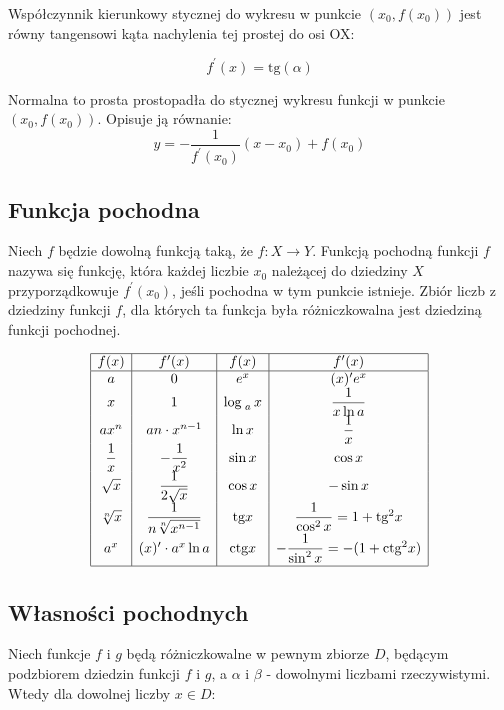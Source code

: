 \documentclass[14pt,a4paper]{extarticle}
\begin{document}
\noindent Współczynnik kierunkowy stycznej do wykresu w punkcie $(x_{0}, f(x_{0}))$ jest równy tangensowi kąta nachylenia tej prostej do osi OX:

$$f^{\prime}(x) = \text{tg}(\alpha)$$

\noindent Normalna to prosta prostopadła do stycznej wykresu funkcji w punkcie $(x_{0}, f(x_{0}))$. Opisuje ją
równanie:
$$y = -\frac{1}{f^{\prime}(x_{0})}(x - x_{0}) + f(x_{0})$$

\subsection{Funkcja pochodna}
Niech $f$ będzie dowolną funkcją taką, że $f:X \rightarrow Y$. Funkcją pochodną funkcji $f$
nazywa się funkcję, która każdej liczbie $x_{0}$ należącej do dziedziny $X$ przyporządkowuje $f^{\prime}(x_{0})$, jeśli
pochodna w tym punkcie istnieje. Zbiór liczb z dziedziny funkcji $f$, dla których ta funkcja była różniczkowalna
jest dziedziną funkcji pochodnej.

{%

\renewcommand{\arraystretch}{2}
\renewcommand{\arraycolsep}{0.5cm}

\begin{center}
\begin{equation*}
\begin{array}{|c|c|c|c|}
\hline
f(x) & f^{\prime}(x) & f(x) & f^{\prime}(x)\\
\hline
 a & 0 & e^{x} & (x)^{\prime}e^{x} \\
 x & 1 & \log_{\;a}x & \dfrac{1}{x \ln a} \\
 ax^{n} & an\cdot x^{n-1} & \ln x & \dfrac{1}{x} \\
 \dfrac{1}{x} & -\dfrac{1}{x^{2}} & \sin x & \cos x \\
 \sqrt{x} & \dfrac{1}{2\sqrt{x}} & \cos x & -\sin x\\
 \sqrt[n]{x} & \dfrac{1}{n\sqrt[n]{x^{n-1}}} & \text{tg} x & \dfrac{1}{\cos^{2}x} = 1 + \text{tg}^{2} x \\
 a^{x} & (x)^{\prime}\cdot a^{x}\ln a & \text{ctg} x & -\dfrac{1}{\sin^{2}x} = -(1 + \text{ctg}^{2} x) \\[\medskipamount]
\hline
\end{array}
\end{equation*}
\end{center}
}%

\subsection{Własności pochodnych}
Niech funkcje $f$ i $g$ będą różniczkowalne w pewnym zbiorze $D$, będącym podzbiorem dziedzin
funkcji $f$ i $g$, a $\alpha$ i $\beta$ - dowolnymi liczbami rzeczywistymi. Wtedy dla dowolnej liczby $x \in D$:
\end{document}
